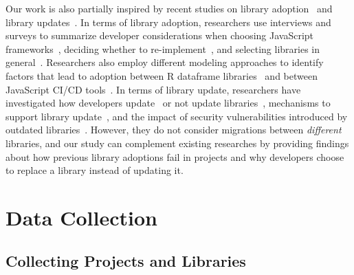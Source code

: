 \documentclass[sigconf, screen]{acmart}
\begin{document}
Our work is also partially inspired by recent studies on library adoption~\cite{pano2018factors, de2018empirical, kavaler2019tool, yin2020team, larios2020selecting, ma2020methodology, lamba2020heard, xu2020reinventing} and library updates~\cite{cox2015measuring, kula2015trusting, bavota2015apache, mirhosseini2017can, kula2018developers, zerouali2018empirical, decan2018evolution, cogo2019empirical, soto2019emergence, dietrich2019dependency, zimmermann2019small}. 
In terms of library adoption, researchers use interviews and surveys to summarize developer considerations when choosing JavaScript frameworks~\cite{pano2018factors}, deciding whether to re-implement~\cite{xu2020reinventing}, and selecting libraries in general~\cite{larios2020selecting}.
Researchers also employ different modeling approaches to identify factors that lead to adoption between R dataframe libraries~\cite{ma2020methodology} and between JavaScript CI/CD tools~\cite{kavaler2019tool, yin2020team, lamba2020heard}. %
In terms of library update, researchers have investigated how developers update~\cite{bavota2015apache} or not update libraries~\cite{cox2015measuring, kula2015trusting, kula2018developers, soto2019emergence, zerouali2018empirical, decan2018evolution}, mechanisms to support library update~\cite{mirhosseini2017can, dietrich2019dependency}, and the impact of security vulnerabilities introduced by outdated libraries~\cite{zimmermann2019small, decan2018impact}.
However, they do not consider migrations between \textit{different} libraries, and our study can complement existing researches by providing findings about how previous library adoptions fail in projects and why developers choose to replace a library instead of updating it.

\section{Data Collection}
\label{sec:data}

\subsection{Collecting Projects and Libraries}
\end{document}
